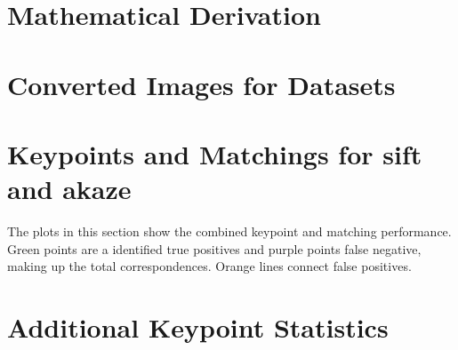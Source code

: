 \documentclass[numbers=noenddot,doktyp=marbeit,fontsize=12pt,sprache=english,hausschrift=true,draft=false]{TUBAFarbeiten}
\begin{document}
\begin{appendix}
    \renewcommand*{\thepage}{\thesection\arabic{page}}
    \renewcommand{\thetable}{\thesection\arabic{table}}
    \renewcommand{\thefigure}{\thesection\arabic{figure}}

    \newpage

    \section{Mathematical Derivation}
    
    \newpage

    \section{Converted Images for Datasets}
    {\setlength{\abovecaptionskip}{-20pt}%
     \setlength{\belowcaptionskip}{-30pt}%
     \setlength{\floatsep}{1pt plus 1pt minus 1pt}%
     \setlength{\textfloatsep}{1pt plus 1.0pt minus 2.0pt}
     \setlength{\intextsep}{1pt plus 1.0pt minus 2.0pt}
    
    
    
    
    }
    \newpage

    \section{Keypoints and Matchings for \acrshort{sift} and \acrshort{akaze}}
    The plots in this section show the combined keypoint and matching performance.
    Green points are a identified true positives and purple points false negative, making up the total correspondences.
    Orange lines connect false positives.
    
    
    \newpage

    \section{Additional Keypoint Statistics}
    
    
    
    
    \newpage

    
    

    \newpage
    \listoftables

    \newpage
    \listoffigures

    \newpage
\end{appendix}
\end{document}
